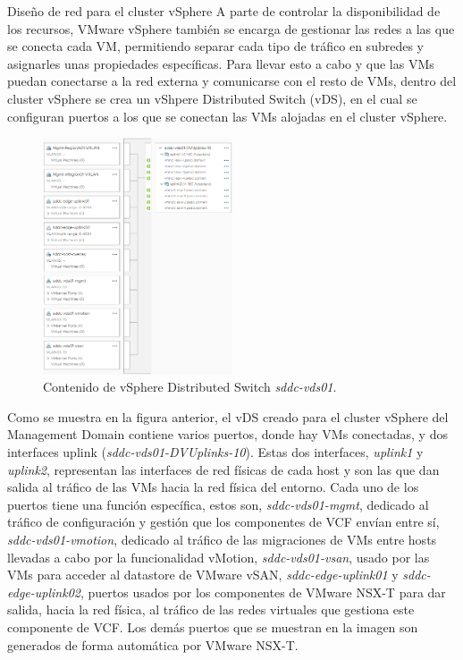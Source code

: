\begin{subsubsection}{Diseño de red para el cluster vSphere}
  A parte de controlar la disponibilidad de los recursos, VMware vSphere también se encarga de gestionar las redes a las que se conecta cada VM, permitiendo separar cada tipo de tráfico en subredes y asignarles unas propiedades específicas. Para llevar esto a cabo y que las VMs puedan conectarse a la red externa y comunicarse con el resto de VMs, dentro del cluster vSphere se crea un vShpere Distributed Switch (vDS), en el cual se configuran puertos a los que se conectan las VMs alojadas en el cluster vSphere.
  \begin{figure}[h]
    \centering
    \includegraphics[width=0.5\textwidth]{imaxes/pruebaconcepto/distributedSwitchEntornoFinal.png}
    \caption{Contenido de vSphere Distributed Switch \textit{sddc-vds01}.}
    \label{fig:port-groups-vSwitch-vSphere}
  \end{figure}
  \FloatBarrier
  Como se muestra en la figura anterior, el vDS creado para el cluster vSphere del Management Domain contiene varios puertos, donde hay VMs conectadas, y dos interfaces uplink (\textit{sddc-vds01-DVUplinks-10}). Estas dos interfaces, \textit{uplink1} y \textit{uplink2}, representan las interfaces de red físicas de cada host y son las que dan salida al tráfico de las VMs hacia la red física del entorno. Cada uno de los puertos tiene una función específica, estos son, \textit{sddc-vds01-mgmt}, dedicado al tráfico de configuración y gestión que los componentes de VCF envían entre sí, \textit{sddc-vds01-vmotion}, dedicado al tráfico de las migraciones de VMs entre hosts llevadas a cabo por la funcionalidad vMotion, \textit{sddc-vds01-vsan}, usado por las VMs para acceder al datastore de VMware vSAN, \textit{sddc-edge-uplink01} y \textit{sddc-edge-uplink02}, puertos usados por los componentes de VMware NSX-T para dar salida, hacia la red física, al tráfico de las redes virtuales que gestiona este componente de VCF. Los demás puertos que se muestran en la imagen son generados de forma automática por VMware NSX-T. 

\end{subsubsection}
